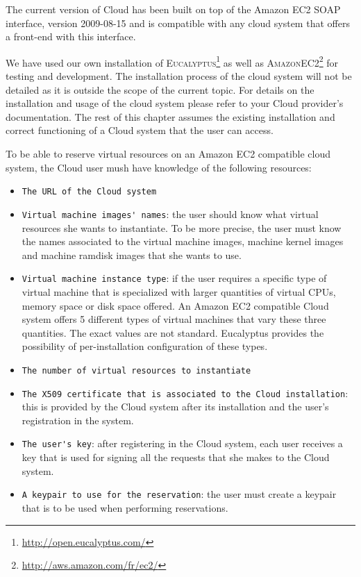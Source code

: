 The current version of \diet Cloud has been built on top of the Amazon EC2 SOAP interface,
version 2009-08-15 and is compatible with any cloud system that offers a front-end with
this interface.

We have used our own installation of
\textsc{Eucalyptus}\footnote{\url{http://open.eucalyptus.com/}}  as
well as
\textsc{AmazonEC2}\footnote{\url{http://aws.amazon.com/fr/ec2/}} for
testing and development. The installation process of the cloud system
will not be detailed as it is outside the scope of the current
topic. For details on the installation and usage of the cloud system
please refer to your Cloud provider's documentation. The rest of this
chapter assumes the existing installation and correct functioning of a
Cloud system that the user can access.

To be able to reserve virtual resources on an Amazon EC2 compatible cloud system, the Cloud user
mush have knowledge of the following resources:
\begin{itemize}
\item \verb!The URL of the Cloud system!
\item \verb!Virtual machine images' names!: the user should know what virtual resources she wants
to instantiate. To be more precise, the user must know the names associated to the virtual machine
images, machine kernel images and machine ramdisk images that she wants to use.
\item \verb!Virtual machine instance type!: if the user requires a specific type of virtual machine
that is specialized with larger quantities of virtual CPUs, memory space or disk space offered.
An Amazon EC2 compatible Cloud system offers 5 different types of virtual machines that vary these
three quantities. The exact values are not standard. Eucalyptus provides the possibility of
per-installation configuration of these types.
\item \verb!The number of virtual resources to instantiate!
\item \verb!The X509 certificate that is associated to the Cloud installation!: this is provided by
the Cloud system after its installation and the user's registration in the system.
\item \verb!The user's key!: after registering in the Cloud system, each user receives a key
that is used for signing all the requests that she makes to the Cloud system.
\item \verb!A keypair to use for the reservation!: the user must create a keypair that is to be used
when performing reservations.
\end{itemize}


